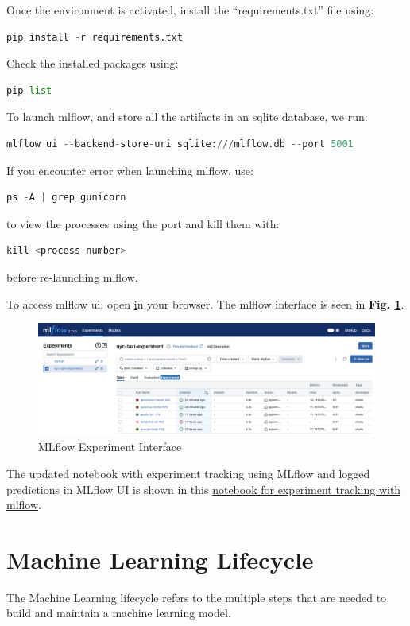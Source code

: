\documentclass[letterpaper,12pt,notitlepage,twoside]{report}
\begin{document}
Once the environment is activated, install the ``requirements.txt'' file using:
\begin{lstlisting}[language=python, numbers=none]
pip install -r requirements.txt
\end{lstlisting}

Check the installed packages using:
\begin{lstlisting}[language=python, numbers=none]
pip list
\end{lstlisting}

To launch mlflow, and store all the artifacts in an sqlite database, we run:
\begin{lstlisting}[language=python, numbers=none]
mlflow ui --backend-store-uri sqlite:///mlflow.db --port 5001
\end{lstlisting}

If you encounter error when launching mlflow, use:
\begin{lstlisting}[language=python, numbers=none]
ps -A | grep gunicorn
\end{lstlisting} to view the processes using the port and kill them with:
\begin{lstlisting}[language=python, numbers=none]
kill <process number>
\end{lstlisting} before re-launching mlflow. 


To access mlflow ui, open \href{http://127.0.0.1:5001} in your browser. The mlflow interface is seen in \textbf{Fig. \ref{fig:3}}.
\begin{figure}[h]
	\centering
	\includegraphics[width=\textwidth]{Images/mlflow-experiment-interface.png}
	\caption{MLflow Experiment Interface}
	\label{fig:3}
\end{figure}
\FloatBarrier

The updated notebook with experiment tracking using MLflow and logged predictions in MLflow UI is shown in this \href{https://github.com/chuksoo/mlops-zoomcamp-2024/blob/main/02%20-%20Experiment%20Tracking/duration-prediction.ipynb}{notebook for experiment tracking with mlflow}.

\section{Machine Learning Lifecycle}
 \begin{funfact}[frametitle=\facttitlep{Fun Fact}{MLOps cycle}]
The Machine Learning lifecycle refers to the multiple steps that are needed to build and maintain a machine learning model.
\end{funfact}
\end{document}
